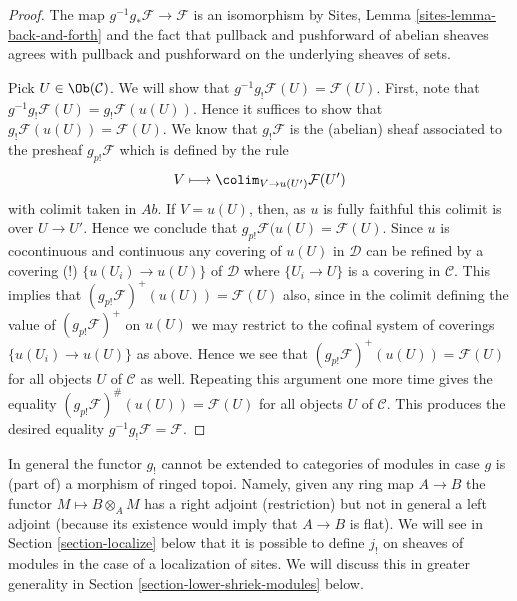 \begin{proof}
The map $g^{-1}g_*\mathcal{F} \to \mathcal{F}$ is an isomorphism
by Sites, Lemma \ref{sites-lemma-back-and-forth} and the fact that
pullback and pushforward of abelian sheaves agrees with
pullback and pushforward on the underlying sheaves of sets.

\medskip\noindent
Pick $U \in \Ob(\mathcal{C})$. We will show that
$g^{-1}g_!\mathcal{F}(U) = \mathcal{F}(U)$. First, note that
$g^{-1}g_!\mathcal{F}(U) = g_!\mathcal{F}(u(U))$. Hence it suffices
to show that $g_!\mathcal{F}(u(U)) = \mathcal{F}(U)$.
We know that $g_!\mathcal{F}$ is the (abelian) sheaf associated
to the presheaf $g_{p!}\mathcal{F}$ which is defined by the rule
$$
V \longmapsto \colim_{V \to u(U')} \mathcal{F}(U')
$$
with colimit taken in $\textit{Ab}$. If $V = u(U)$, then, as $u$ is
fully faithful this colimit is over $U \to U'$. Hence we conclude
that $g_{p!}\mathcal{F}(u(U) = \mathcal{F}(U)$.
Since $u$ is cocontinuous and continuous any covering of $u(U)$ in
$\mathcal{D}$ can be refined by a covering (!) $\{u(U_i) \to u(U)\}$
of $\mathcal{D}$ where $\{U_i \to U\}$ is a covering in $\mathcal{C}$.
This implies that $(g_{p!}\mathcal{F})^+(u(U)) = \mathcal{F}(U)$ also,
since in the colimit defining the value of $(g_{p!}\mathcal{F})^+$
on $u(U)$ we may restrict to the cofinal system of coverings
$\{u(U_i) \to u(U)\}$ as above. Hence we see that
$(g_{p!}\mathcal{F})^+(u(U)) = \mathcal{F}(U)$ for all objects $U$
of $\mathcal{C}$ as well. Repeating this argument one more time
gives the equality $(g_{p!}\mathcal{F})^\#(u(U)) = \mathcal{F}(U)$
for all objects $U$ of $\mathcal{C}$. This produces the desired
equality $g^{-1}g_!\mathcal{F} = \mathcal{F}$.
\end{proof}

\begin{remark}
\label{remark-no-extension}
In general the functor $g_!$ cannot be extended to categories of modules
in case $g$ is (part of) a morphism of ringed topoi. Namely, given any
ring map $A \to B$ the functor $M \mapsto B \otimes_A M$ has a right adjoint
(restriction) but not in general a left adjoint (because its existence
would imply that $A \to B$ is flat). We will see in
Section \ref{section-localize}
below that it is possible to define $j_!$ on sheaves of modules
in the case of a localization of sites.
We will discuss this in greater generality in
Section \ref{section-lower-shriek-modules} below.
\end{remark}

